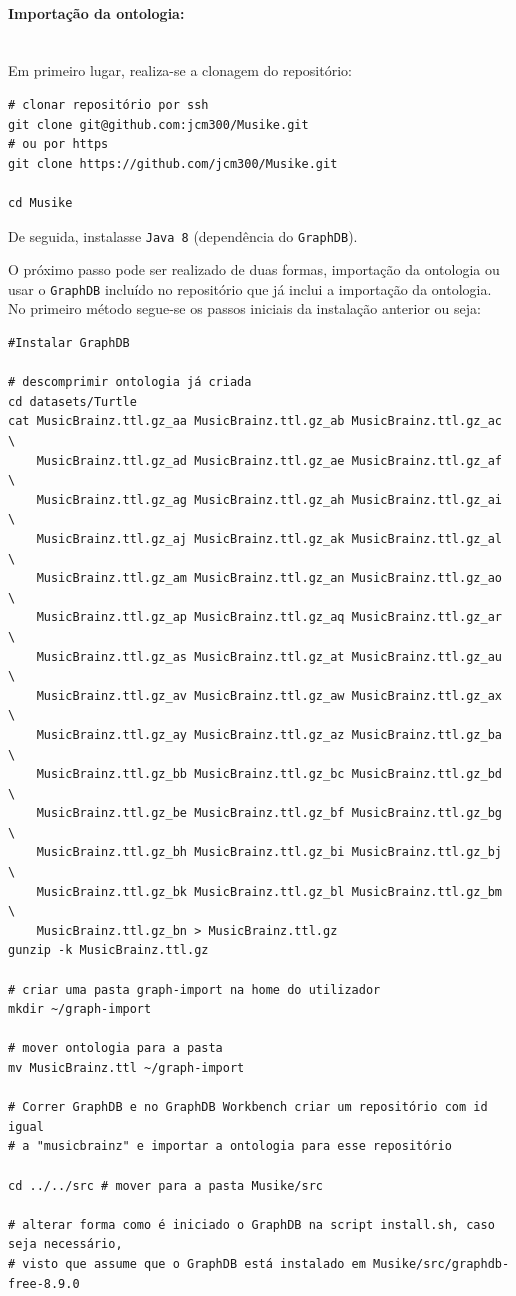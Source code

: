 \documentclass{article}
\begin{document}
\paragraph{Importação da ontologia:}\mbox{}\\

Em primeiro lugar, realiza-se a clonagem do repositório:

\begin{framed}
\begin{verbatim}
# clonar repositório por ssh
git clone git@github.com:jcm300/Musike.git
# ou por https
git clone https://github.com/jcm300/Musike.git

cd Musike
\end{verbatim}
\end{framed}

De seguida, instalasse \texttt{Java 8} (dependência do \texttt{GraphDB}).

O próximo passo pode ser realizado de duas formas, importação da ontologia ou usar o \texttt{GraphDB} incluído no repositório que já inclui a importação da ontologia. No primeiro método segue-se os passos iniciais da instalação anterior ou seja:

\begin{framed}
\begin{verbatim}
#Instalar GraphDB

# descomprimir ontologia já criada
cd datasets/Turtle
cat MusicBrainz.ttl.gz_aa MusicBrainz.ttl.gz_ab MusicBrainz.ttl.gz_ac \
    MusicBrainz.ttl.gz_ad MusicBrainz.ttl.gz_ae MusicBrainz.ttl.gz_af \
    MusicBrainz.ttl.gz_ag MusicBrainz.ttl.gz_ah MusicBrainz.ttl.gz_ai \
    MusicBrainz.ttl.gz_aj MusicBrainz.ttl.gz_ak MusicBrainz.ttl.gz_al \
    MusicBrainz.ttl.gz_am MusicBrainz.ttl.gz_an MusicBrainz.ttl.gz_ao \
    MusicBrainz.ttl.gz_ap MusicBrainz.ttl.gz_aq MusicBrainz.ttl.gz_ar \
    MusicBrainz.ttl.gz_as MusicBrainz.ttl.gz_at MusicBrainz.ttl.gz_au \
    MusicBrainz.ttl.gz_av MusicBrainz.ttl.gz_aw MusicBrainz.ttl.gz_ax \
    MusicBrainz.ttl.gz_ay MusicBrainz.ttl.gz_az MusicBrainz.ttl.gz_ba \
    MusicBrainz.ttl.gz_bb MusicBrainz.ttl.gz_bc MusicBrainz.ttl.gz_bd \
    MusicBrainz.ttl.gz_be MusicBrainz.ttl.gz_bf MusicBrainz.ttl.gz_bg \
    MusicBrainz.ttl.gz_bh MusicBrainz.ttl.gz_bi MusicBrainz.ttl.gz_bj \
    MusicBrainz.ttl.gz_bk MusicBrainz.ttl.gz_bl MusicBrainz.ttl.gz_bm \
    MusicBrainz.ttl.gz_bn > MusicBrainz.ttl.gz
gunzip -k MusicBrainz.ttl.gz

# criar uma pasta graph-import na home do utilizador
mkdir ~/graph-import

# mover ontologia para a pasta
mv MusicBrainz.ttl ~/graph-import

# Correr GraphDB e no GraphDB Workbench criar um repositório com id igual
# a "musicbrainz" e importar a ontologia para esse repositório

cd ../../src # mover para a pasta Musike/src

# alterar forma como é iniciado o GraphDB na script install.sh, caso seja necessário,
# visto que assume que o GraphDB está instalado em Musike/src/graphdb-free-8.9.0
\end{verbatim}
\end{framed}
\end{document}
